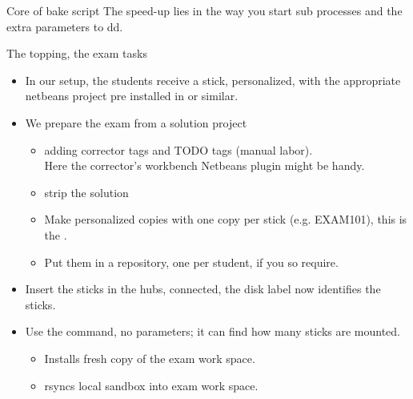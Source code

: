 \begin{frame}{Core of bake script}
The speed-up lies in the way you start  sub processes and the extra
parameters to dd.

\end{frame}

\begin{frame}{The topping, the exam tasks}
  \begin{itemize}
  \item In our setup, the students receive a stick, personalized, with
    the appropriate netbeans project pre installed in
     or similar.
  \item We prepare the exam from a solution project
    \begin{itemize}
    \item adding corrector tags and TODO tags (manual labor).\\
      Here the corrector's workbench Netbeans plugin might be handy.
    \item strip the solution
    \item Make personalized copies with one copy per stick
      (e.g. EXAM101), this is the .
    \item Put them in a repository, one per student, if you so require.
    \end{itemize}

  \item Insert the sticks in the hubs, connected, the disk label now identifies the sticks.
  \item Use the  command, no parameters; it can find
    how many sticks are mounted.
    \begin{itemize}
    \item Installs fresh copy of the exam work space.
    \item rsyncs local sandbox into exam work space.
    \end{itemize}
  \end{itemize}
\end{frame}


